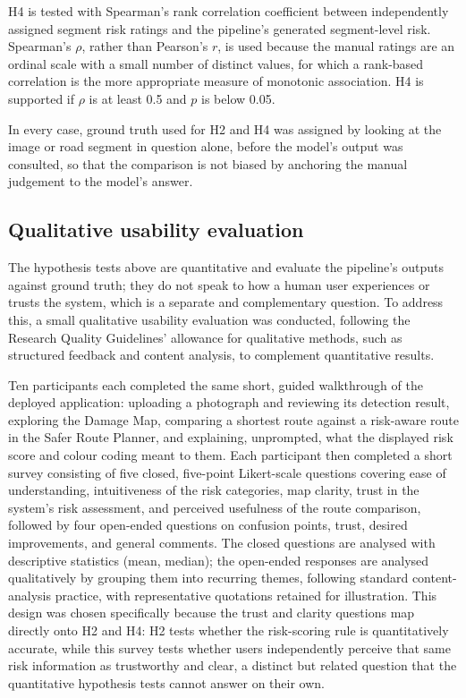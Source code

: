 \documentclass[10pt,a4paper,twocolumn]{article}
\begin{document}
H4 is tested with Spearman's rank correlation coefficient between
independently assigned segment risk ratings and the pipeline's generated
segment-level risk. Spearman's $\rho$, rather than Pearson's $r$, is used
because the manual ratings are an ordinal scale with a small number of
distinct values, for which a rank-based correlation is the more
appropriate measure of monotonic association. H4 is supported if $\rho$ is
at least 0.5 and $p$ is below 0.05.

In every case, ground truth used for H2 and H4 was assigned by looking at
the image or road segment in question alone, before the model's output
was consulted, so that the comparison is not biased by anchoring the
manual judgement to the model's answer.

\subsection{Qualitative usability evaluation}
\label{sec:method-qualitative}

The hypothesis tests above are quantitative and evaluate the pipeline's
outputs against ground truth; they do not speak to how a human user
experiences or trusts the system, which is a separate and complementary
question. To address this, a small qualitative usability evaluation was
conducted, following the Research Quality Guidelines' allowance for
qualitative methods, such as structured feedback and content analysis, to
complement quantitative results.

Ten participants each completed the same short, guided walkthrough of the deployed application: uploading a
photograph and reviewing its detection result, exploring the Damage Map,
comparing a shortest route against a risk-aware route in the Safer Route
Planner, and explaining, unprompted, what the displayed risk score and
colour coding meant to them. Each participant then completed a short
survey consisting of five closed, five-point Likert-scale questions
covering ease of understanding, intuitiveness of the risk categories, map
clarity, trust in the system's risk assessment, and perceived usefulness
of the route comparison, followed by four open-ended questions on
confusion points, trust, desired improvements, and general comments. The
closed questions are analysed with descriptive statistics (mean, median);
the open-ended responses are analysed qualitatively by grouping them into
recurring themes, following standard content-analysis practice, with
representative quotations retained for illustration. This design was
chosen specifically because the trust and clarity questions map directly
onto H2 and H4: H2 tests whether the risk-scoring rule is quantitatively
accurate, while this survey tests whether users independently perceive
that same risk information as trustworthy and clear, a distinct but
related question that the quantitative hypothesis tests cannot answer on
their own.
\end{document}
